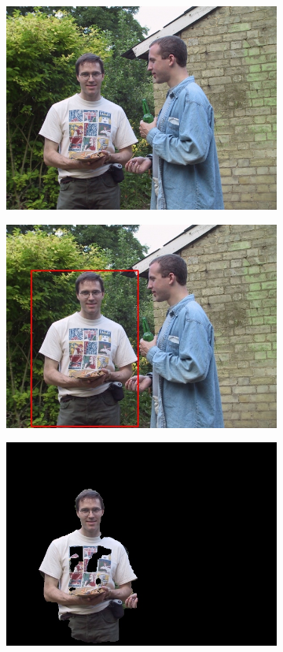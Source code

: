 \documentclass[a4paper,11]{article}
\begin{document}
\begin{center}
\begin{figure}[H]
   \begin{subfigure}{0.33\textwidth}
      \centering
      \includegraphics[width=0.9\linewidth]{images/person4}
    \end{subfigure}
    \begin{subfigure}{.33\textwidth}
      \centering
      \includegraphics[width=0.9\linewidth]{results/input/person4}
    \end{subfigure}
    \begin{subfigure}{0.33\textwidth}
      \centering
      \includegraphics[width=0.9\linewidth]{results/person4}
   \end{subfigure}\\
    \vspace{1em}
    

\end{figure}
\end{center}
\end{document}
